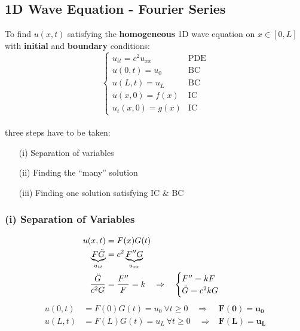 \subsection{1D Wave Equation - Fourier Series}
To find $u(x,t)$ satisfying the \textbf{homogeneous} 1D wave equation on $x\in[0,L]$ with \textbf{initial} and
\textbf{boundary} conditions:
\begin{equation*}
    \begin{cases}
        u_{tt}=c^2u_{xx} & \text{PDE} \\
        u(0,t)=u_0       & \text{BC}  \\
        u(L,t)=u_L       & \text{BC}  \\
        u(x,0)=f(x)      & \text{IC}  \\
        u_t(x,0)=g(x)    & \text{IC}
    \end{cases}
\end{equation*}\\
three steps have to be taken:
\begin{itemize}
    \item[(i)] Separation of variables
    \item[(ii)] Finding the ``many'' solution
    \item[(iii)] Finding one solution satisfying IC \& BC
\end{itemize}

\subsubsection{(i) Separation of Variables}
\begin{align*}
    u(x,t)                          & =F(x)G(t)                                               \\
    \underbrace{F\ddot{G}}_{u_{tt}} & =c^2\underbrace{F''G}_{u_{xx}}                          \\
    \frac{\ddot{G}}{c^2G}           & =\frac{F''}{F}=k\hspace*{10pt}\Rightarrow\hspace*{10pt}
    \begin{cases}
        F''=kF \\
        \ddot{G}=c^2kG
    \end{cases}
\end{align*}
\begin{align*}
    u(0,t) & =F(0)G(t)=u_0\mathrm{~}\forall t\geq0\quad\Rightarrow & \mathbf{F(0)}=\mathbf{u_0} \\
    u(L,t) & =F(L)G(t)=u_L\mathrm{~}\forall t\geq0\quad\Rightarrow & \mathbf{F(L)}=\mathbf{u_L}
\end{align*}

